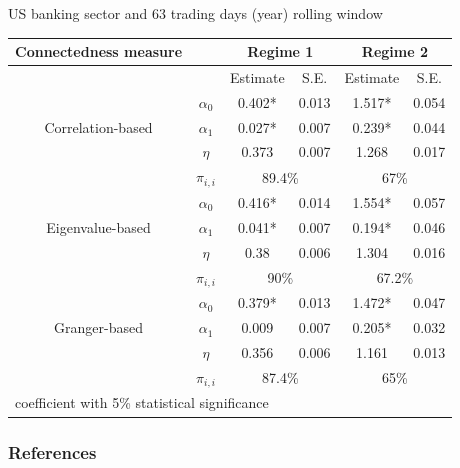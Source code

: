 \documentclass{beamer}
\begin{document}
\begin{frame}
    US banking sector and 63 trading days (year) rolling window
    \begin{table}\small
        \begin{tabular}{cccccc}
          \toprule
           Connectedness measure &  & \multicolumn{2}{c}{\bfseries Regime 1} & \multicolumn{2}{c}{\bfseries Regime 2}  \\
           \hline
           & & Estimate & S.E. & Estimate & S.E. \\
           \hline
           \multirow{3}{*}[\normalbaselineskip]{Correlation-based} & $\alpha_0$ & 0.402* & 0.013 & 1.517*  & 0.054 \\
            & $\alpha_1$ & 0.027* & 0.007 & 0.239* & 0.044 \\
            & $\eta$ & 0.373 & 0.007 & 1.268 & 0.017 \\
            & $\pi_{i,i}$ &  \multicolumn{2}{c}{89.4\%} & \multicolumn{2}{c}{67\%}\\
            \hline
            \multirow{3}{*}[\normalbaselineskip]{Eigenvalue-based} & $\alpha_0$ & 0.416* & 0.014 & 1.554*  & 0.057 \\
            & $\alpha_1$ & 0.041* & 0.007 & 0.194* & 0.046 \\
            & $\eta$ & 0.38 & 0.006 & 1.304 & 0.016 \\
            & $\pi_{i,i}$ &  \multicolumn{2}{c}{90\%} & \multicolumn{2}{c}{67.2\%}\\
            \hline
            \multirow{3}{*}[\normalbaselineskip]{Granger-based} & $\alpha_0$ & 0.379* & 0.013 & 1.472*  & 0.047 \\
            & $\alpha_1$ & 0.009 & 0.007 & 0.205* & 0.032 \\
            & $\eta$ & 0.356 & 0.006 & 1.161 & 0.013 \\
            & $\pi_{i,i}$ &  \multicolumn{2}{c}{87.4\%} & \multicolumn{2}{c}{65\%}\\
            \hline
          \multicolumn{6}{l}{\footnotesize * coefficient with 5\% statistical significance} \\
          \hline
        \end{tabular}
      \end{table}

\end{frame}    

\begin{frame}[allowframebreaks]
\frametitle{References}
\printbibliography
\end{frame}
\end{document}
